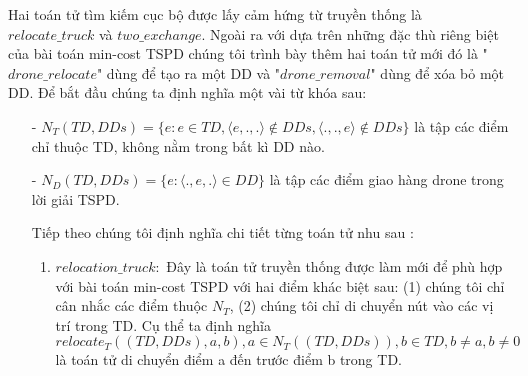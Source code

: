 \documentclass[a4paper,12pt]{report}
\begin{document}
Hai toán tử tìm kiếm cục bộ được lấy cảm hứng từ truyền thống là $relocate\_truck$ và $two\_exchange$. Ngoài ra với dựa trên những đặc thù riêng biệt của bài toán min-cost TSPD chúng tôi trình bày thêm hai toán tử mới đó là "$drone\_relocate$" dùng để tạo ra một DD và "$drone\_removal$" dùng để xóa bỏ một DD. Để bắt đầu chúng ta định nghĩa một vài từ khóa sau:
\begin{itemize}
\item[-] $N_T(TD,DDs)=\{e:e \in TD,\langle e,.,. \rangle \notin DDs,\langle .,.,e \rangle \notin DDs\}$ là tập các điểm chỉ thuộc TD, không nằm trong bất kì DD nào.
\item[-] $N_D(TD,DDs)=\{e: \langle .,e,. \rangle \in DD\}$ là tập các điểm giao hàng drone trong lời giải TSPD.

Tiếp theo chúng tôi định nghĩa chi tiết từng toán tử nhu sau :
\begin{enumerate}
\item $relocation\_truck:$ Đây là toán tử truyền thống được làm mới để phù hợp với bài toán min-cost TSPD với hai điểm khác biệt sau: (1) chúng tôi chỉ cân nhắc các điểm thuộc $N_T$, (2) chúng tôi chỉ di chuyển nút vào các vị trí trong TD. Cụ thể ta định nghĩa
$$relocate_T((TD,DDs),a,b),a \in N_T((TD,DDs)),b \in TD, b \neq a, b \neq 0$$ 
là toán tử di chuyển điểm a đến trước điểm b trong TD.
\begin{figure}[H]


\end{figure}
\end{enumerate}
\end{itemize}
\end{document}
